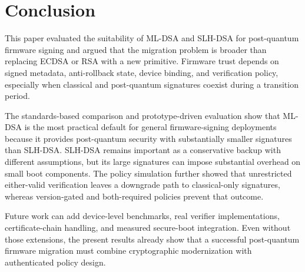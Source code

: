 \section{Conclusion}

This paper evaluated the suitability of ML-DSA and SLH-DSA for post-quantum firmware signing and argued that the migration problem is broader than replacing ECDSA or RSA with a new primitive. Firmware trust depends on signed metadata, anti-rollback state, device binding, and verification policy, especially when classical and post-quantum signatures coexist during a transition period.

The standards-based comparison and prototype-driven evaluation show that ML-DSA is the most practical default for general firmware-signing deployments because it provides post-quantum security with substantially smaller signatures than SLH-DSA. SLH-DSA remains important as a conservative backup with different assumptions, but its large signatures can impose substantial overhead on small boot components. The policy simulation further showed that unrestricted either-valid verification leaves a downgrade path to classical-only signatures, whereas version-gated and both-required policies prevent that outcome.

Future work can add device-level benchmarks, real verifier implementations, certificate-chain handling, and measured secure-boot integration. Even without those extensions, the present results already show that a successful post-quantum firmware migration must combine cryptographic modernization with authenticated policy design.
